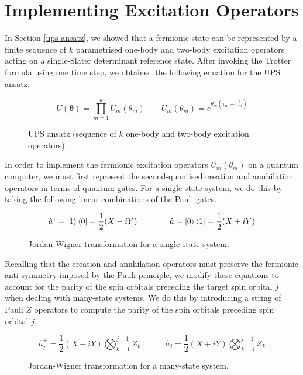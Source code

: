 \section{Implementing Excitation Operators}

In Section \ref{ups-ansatz}, we showed that a fermionic state can be represented by a finite sequence of $k$ parametrised one-body and two-body excitation operators acting on a single-Slater determinant reference state. After invoking the Trotter formula using one time step, we obtained the following equation for the UPS ansatz.

\begin{figure}[H]
    \centering
    \begin{equation*}
        U(\bm\theta) = \prod_{m=1}^k U_m(\theta_m) \qquad
        U_m(\theta_m) = e^{\theta_m (\tau_m - \tau_m^\dagger)}
    \end{equation*}
    \caption{UPS ansatz (sequence of $k$ one-body and two-body excitation operators).}
\end{figure}

In order to implement the fermionic excitation operators $U_m(\theta_m)$ on a quantum computer, we must first represent the second-quantised creation and annhilation operators in terms of quantum gates. For a single-state system, we do this by taking the following linear combinations of the Pauli gates.

\begin{figure}[H]
    \centering
    \begin{equation*}
        \hat a^\dagger = \ket 1 \bra 0 = \frac{1}{2} (X - iY) \qquad\qquad
        \hat a = \ket 0 \bra 1 = \frac{1}{2} (X + iY) 
    \end{equation*}
    \caption{Jordan-Wigner transformation for a single-state system.}
\end{figure}

Recalling that the creation and annhilation operators must preserve the fermionic anti-symmetry imposed by the Pauli principle, we modify these equations to account for the parity of the spin orbitals preceding the target spin orbital $j$ when dealing with many-state systems. We do this by introducing a string of Pauli $Z$ operators to compute the parity of the spin orbitals preceding spin orbital $j$.

\begin{figure}[H]
    \centering
    \begin{equation*}
        \hat a_j^+ = \frac{1}{2} (X - iY) \bigotimes_{k=1}^{j-1} Z_k \qquad\quad
        \hat a_j = \frac{1}{2} (X + iY) \bigotimes_{k=1}^{j-1} Z_k
    \end{equation*}
    \caption{Jordan-Wigner transformation for a many-state system.}
\end{figure}

